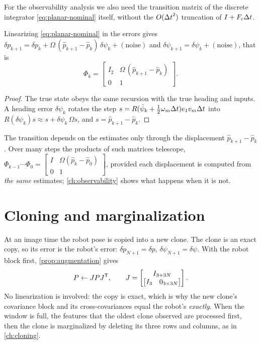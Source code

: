 For the observability analysis we also need the transition matrix of the discrete integrator \eqref{eq:planar-nominal} itself, without the
$O({\Delta t}^2)$ truncation of $I + F_c{\Delta t}$.

\begin{proposition}
\label{prop:planar-phi}
Linearizing \eqref{eq:planar-nominal} in the errors gives $\delta p_{k+1} = \delta p_k + \Omega\,(\hat p_{k+1} - \hat p_k)\,\delta\psi_k + (\text{noise})$ and
$\delta\psi_{k+1} = \delta\psi_k + (\text{noise})$, that is
\begin{equation}
  \Phi_k = \begin{bmatrix} I_2 & \Omega\,(\hat p_{k+1} - \hat p_k) \\ 0 & 1 \end{bmatrix}.
  \label{eq:planar-phi}
\end{equation}
\end{proposition}
\begin{proof}
The true state obeys the same recursion with the true heading and inputs. A heading error $\delta\psi_k$ rotates the step
$s = R(\hat\psi_k + \tfrac12\omega_m{\Delta t})e_1v_m{\Delta t}$ into $R(\delta\psi_k)s \approx s + \delta\psi_k\,\Omega s$, and $s = \hat p_{k+1} - \hat p_k$.
\end{proof}

The transition depends on the estimates only through the displacement $\hat p_{k+1} - \hat p_k$. Over many steps the products of such matrices
telescope, $\Phi_{k-1}\cdots\Phi_0 = \begin{bmatrix} I & \Omega(\hat p_k - \hat p_0) \\ 0 & 1\end{bmatrix}$, provided each displacement is computed from
\emph{the same} estimates; \cref{ch:observability} shows what happens when it is not.

\section{Cloning and marginalization}

At an image time the robot pose is copied into a new clone. The clone is an exact copy, so its error is the robot's error:
$\delta p_{N+1} = \delta p$, $\delta\psi_{N+1} = \delta\psi$. With the robot block first, \cref{prop:augmentation} gives
\begin{equation}
  P \gets JPJ^{\mathsf{T}}, \qquad J = \begin{bmatrix} I_{3+3N} \\ \begin{bmatrix} I_3 & 0_{3\times3N} \end{bmatrix} \end{bmatrix}.
\end{equation}
No linearization is involved: the copy is exact, which is why the new clone's covariance block and its cross-covariances equal the robot's
\emph{exactly}. When the window is full, the features that the oldest clone observed are processed first, then the clone is marginalized by
deleting its three rows and columns, as in \cref{ch:cloning}.

